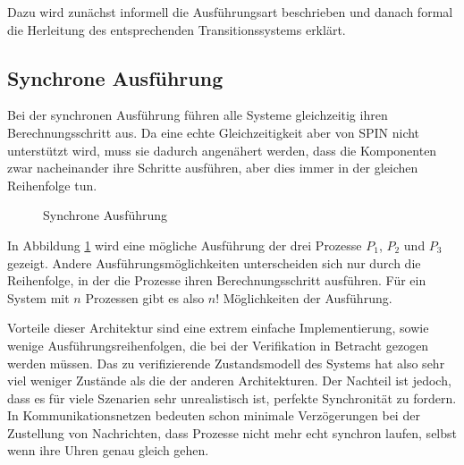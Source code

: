 Dazu wird zunächst informell die Ausführungsart beschrieben und danach formal die Herleitung des entsprechenden Transitionssystems erklärt.

\subsection{Synchrone Ausführung}
Bei der synchronen Ausführung führen alle Systeme gleichzeitig ihren Berechnungsschritt aus.
Da eine echte Gleichzeitigkeit aber von SPIN nicht unterstützt wird, muss sie dadurch angenähert werden, dass die Komponenten zwar nacheinander ihre Schritte ausführen, aber dies  immer in der gleichen Reihenfolge tun.

\begin{figure}[h]
  \centering
  \caption{Synchrone Ausführung}
  \label{fig:synchronized_execution}
\end{figure}

In Abbildung \ref{fig:synchronized_execution} wird eine mögliche Ausführung der drei Prozesse $P_1$, $P_2$ und $P_3$ gezeigt.
Andere Ausführungsmöglichkeiten unterscheiden sich nur durch die Reihenfolge, in der die Prozesse ihren Berechnungsschritt ausführen.
Für ein System mit $n$ Prozessen gibt es also $n!$ Möglichkeiten der Ausführung.

Vorteile dieser Architektur sind eine extrem einfache Implementierung, sowie wenige Ausführungsreihenfolgen, die bei der Verifikation in Betracht gezogen werden müssen.
Das zu verifizierende Zustandsmodell des Systems hat also sehr viel weniger Zustände als die der anderen Architekturen.
Der Nachteil ist jedoch, dass es für viele Szenarien sehr unrealistisch ist, perfekte Synchronität zu fordern.
In Kommunikationsnetzen bedeuten schon minimale Verzögerungen bei der Zustellung von Nachrichten, dass Prozesse nicht mehr echt synchron laufen, selbst wenn ihre Uhren genau gleich gehen.

